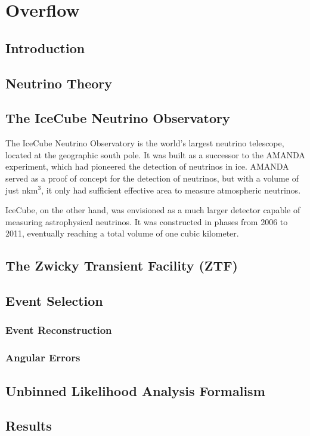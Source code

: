 \setchapterpreamble[u]{\margintoc}
\chapter{Overflow}
\section{Introduction}
\section{Neutrino Theory}
\section{The IceCube Neutrino Observatory}
The IceCube Neutrino Observatory is the world's largest neutrino telescope, located at the geographic south pole. It was built as a successor to the AMANDA experiment, which had pioneered the detection of neutrinos in ice. AMANDA served as a proof of concept for the detection of neutrinos, but with a volume of just nkm$^{3}$, it only had sufficient effective area to measure atmospheric neutrinos. 

IceCube, on the other hand, was envisioned as a much larger detector capable of measuring astrophysical neutrinos. It was constructed in phases from 2006 to 2011, eventually reaching a total volume of one cubic kilometer. 
\section{The Zwicky Transient Facility (ZTF)}

\section{Event Selection}

\subsection{Event Reconstruction}
\subsection{Angular Errors}
\section{Unbinned Likelihood Analysis Formalism}

\section{Results}
